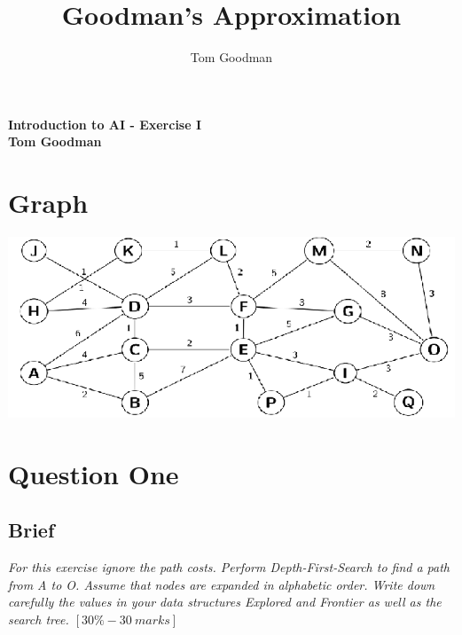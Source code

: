 \documentclass{article}
\title{Goodman's Approximation}
\author{Tom Goodman}
\date{}
\begin{document}
\begin{titlepage}
	\begin{flushleft}
		\vspace*{1cm}
		\Huge
		\textbf{Introduction to AI - Exercise I} \\
		\vspace*{1cm}
		\Large
		\textbf{Tom Goodman} \\
	\end{flushleft}
\end{titlepage}
\newpage
\section{Graph}
\includegraphics{IntroToAIE1Graph.png}
\section{Question One}
\subsection{Brief}
\textit{For this exercise ignore the path costs. Perform Depth-First-Search to find a path from
A to O. Assume that nodes are expanded in alphabetic order. Write down carefully the
values in your data structures Explored and Frontier as well as the search tree. $[30\% - 30\ marks]$}
\end{document}
